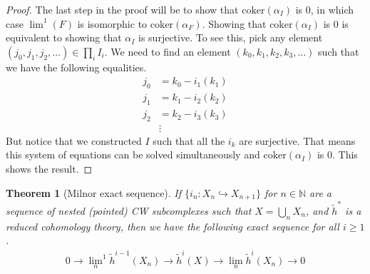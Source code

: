 \documentclass[12pt, notitlepage]{article}
\newtheorem{thm}{Theorem}[section]
\theoremstyle{definition}
\newcommand{\redco}{\widetilde{h}}
\newcommand{\coker}{\mathrm{coker}}
\begin{document}
\begin{proof}
The last step in the proof will be to show that $\coker(\alpha_I)$ is $0$, in which case
${\lim}^1(F)$ is isomorphic to $\coker(\alpha_F)$. Showing that $\coker(\alpha_I)$ is $0$ is
equivalent to showing that $\alpha_I$ is surjective. To see this, pick any element
$(j_0, j_1, j_2, \ldots) \in \prod_i I_i$. We need to find an element $(k_0, k_1, k_2, k_3, \ldots)$
such that we have the following equalities.
\begin{align*}
  j_0 &= k_0 - i_1(k_1) \\
  j_1 &= k_1 - i_2(k_2) \\
  j_2 &= k_2 - i_3(k_3) \\
      &\vdots
\end{align*}
But notice that we constructed $I$ such that all the $i_k$ are surjective. That means this system of
equations can be solved simultaneously and $\coker(\alpha_I)$ is $0$. This shows the result.

\end{proof}

\begin{thm}[Milnor exact sequence] \label{thm-milnor} If $\{ i_n : X_n \hookrightarrow X_{n+1} \}$
  for $n \in \mathbb{N}$ are a sequence of nested (pointed) CW subcomplexes such that
  $X = \bigcup_n X_n$, and $\redco^{\ast}$ is a reduced cohomology theory, then we have the
  following exact sequence for all $i \geq 1$.
  \begin{align*}
    0 \rightarrow {\lim_{n}}^1 \redco^{i-1}(X_n) \rightarrow \redco^i(X) \rightarrow \lim_n \redco^i(X_n) \rightarrow 0
  \end{align*}
\end{thm}
\end{document}
